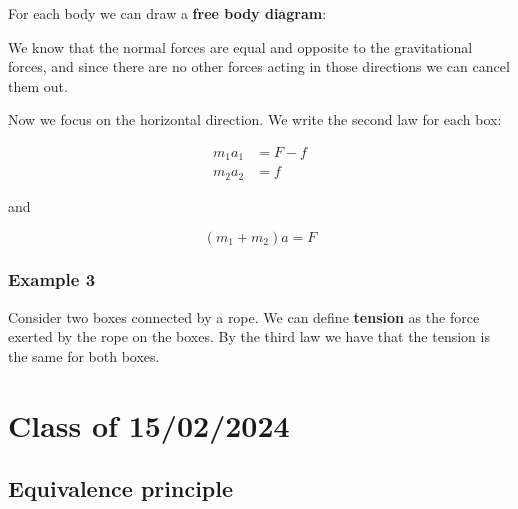 \documentclass[14pt]{extarticle}
\begin{document}
For each body we can draw a \textbf{free body diagram}:

\begin{center}


\end{center}

We know that the normal forces are equal and opposite to the gravitational forces, and since there are no other forces acting in those directions we can cancel them out.

Now we focus on the horizontal direction.
We write the second law for each box:

\begin{align*}
  m_1 a_1 & = F - f \\
  m_2 a_2 & = f
\end{align*}

and

$$
  (m_1 + m_2) a = F
$$

\subsubsection{Example 3}

Consider two boxes connected by a rope.
We can define \textbf{tension} as the force exerted by the rope on the boxes.
By the third law we have that the tension is the same for both boxes.

\section{Class of 15/02/2024}

\subsection{Equivalence principle}
\end{document}
